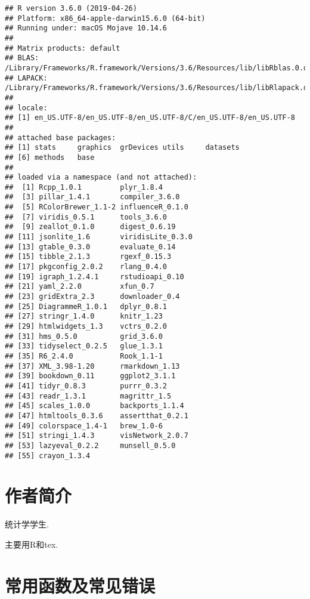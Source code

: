 \documentclass[]{ctexbook}
\begin{document}
\begin{verbatim}
## R version 3.6.0 (2019-04-26)
## Platform: x86_64-apple-darwin15.6.0 (64-bit)
## Running under: macOS Mojave 10.14.6
## 
## Matrix products: default
## BLAS:   /Library/Frameworks/R.framework/Versions/3.6/Resources/lib/libRblas.0.dylib
## LAPACK: /Library/Frameworks/R.framework/Versions/3.6/Resources/lib/libRlapack.dylib
## 
## locale:
## [1] en_US.UTF-8/en_US.UTF-8/en_US.UTF-8/C/en_US.UTF-8/en_US.UTF-8
## 
## attached base packages:
## [1] stats     graphics  grDevices utils     datasets 
## [6] methods   base     
## 
## loaded via a namespace (and not attached):
##  [1] Rcpp_1.0.1         plyr_1.8.4        
##  [3] pillar_1.4.1       compiler_3.6.0    
##  [5] RColorBrewer_1.1-2 influenceR_0.1.0  
##  [7] viridis_0.5.1      tools_3.6.0       
##  [9] zeallot_0.1.0      digest_0.6.19     
## [11] jsonlite_1.6       viridisLite_0.3.0 
## [13] gtable_0.3.0       evaluate_0.14     
## [15] tibble_2.1.3       rgexf_0.15.3      
## [17] pkgconfig_2.0.2    rlang_0.4.0       
## [19] igraph_1.2.4.1     rstudioapi_0.10   
## [21] yaml_2.2.0         xfun_0.7          
## [23] gridExtra_2.3      downloader_0.4    
## [25] DiagrammeR_1.0.1   dplyr_0.8.1       
## [27] stringr_1.4.0      knitr_1.23        
## [29] htmlwidgets_1.3    vctrs_0.2.0       
## [31] hms_0.5.0          grid_3.6.0        
## [33] tidyselect_0.2.5   glue_1.3.1        
## [35] R6_2.4.0           Rook_1.1-1        
## [37] XML_3.98-1.20      rmarkdown_1.13    
## [39] bookdown_0.11      ggplot2_3.1.1     
## [41] tidyr_0.8.3        purrr_0.3.2       
## [43] readr_1.3.1        magrittr_1.5      
## [45] scales_1.0.0       backports_1.1.4   
## [47] htmltools_0.3.6    assertthat_0.2.1  
## [49] colorspace_1.4-1   brew_1.0-6        
## [51] stringi_1.4.3      visNetwork_2.0.7  
## [53] lazyeval_0.2.2     munsell_0.5.0     
## [55] crayon_1.3.4
\end{verbatim}

\hypertarget{author}{%
\chapter*{作者简介}\label{author}}


统计学学生.

主要用R和tex.

\mainmatter

\hypertarget{section-2}{%
\chapter{常用函数及常见错误}\label{section-2}}
\end{document}
